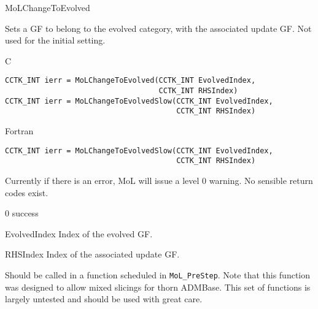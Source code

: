 \begin{FunctionDescription}{MoLChangeToEvolved}
  \label{CactusBase_MoL_MoLChangeToEvolved}

  Sets a GF to belong to the evolved category, with the associated
  update GF. Not used for the initial setting.

  \begin{SynopsisSection}
    \begin{Synopsis}{C}
\begin{verbatim}
CCTK_INT ierr = MoLChangeToEvolved(CCTK_INT EvolvedIndex, 
                                   CCTK_INT RHSIndex)
CCTK_INT ierr = MoLChangeToEvolvedSlow(CCTK_INT EvolvedIndex, 
                                       CCTK_INT RHSIndex)
\end{verbatim}
    \end{Synopsis}
    \begin{Synopsis}{Fortran}
\begin{verbatim}
CCTK_INT ierr = MoLChangeToEvolvedSlow(CCTK_INT EvolvedIndex, 
                                       CCTK_INT RHSIndex)
\end{verbatim}
    \end{Synopsis}
  \end{SynopsisSection}

  \begin{ResultSection}
    \begin{ResultNote}
      Currently if there is an error, MoL will issue a level 0
      warning. No sensible return codes exist.
    \end{ResultNote}
    \begin{Result}{\rm 0}
      success
    \end{Result}
  \end{ResultSection}

  \begin{ParameterSection}
    \begin{Parameter}{EvolvedIndex}
      Index of the evolved GF.
    \end{Parameter}
    \begin{Parameter}{RHSIndex}
      Index of the associated update GF.
    \end{Parameter}
  \end{ParameterSection}

  \begin{Discussion}
    Should be called in a function scheduled in {\tt MoL\_PreStep}.
    Note that this function was designed to allow mixed slicings for
    thorn ADMBase. This set of functions is largely untested and
    should be used with great care.
  \end{Discussion}


\end{FunctionDescription}
